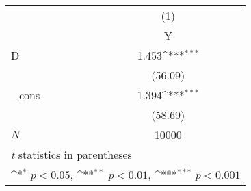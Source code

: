 {
\def\sym#1{\ifmmode^{#1}\else\(^{#1}\)\fi}
\begin{tabular}{l*{1}{c}}
\hline\hline
            &\multicolumn{1}{c}{(1)}\\
            &\multicolumn{1}{c}{Y}\\
\hline
D           &       1.453\sym{***}\\
            &     (56.09)         \\
[1em]
\_cons      &       1.394\sym{***}\\
            &     (58.69)         \\
\hline
\(N\)       &       10000         \\
\hline\hline
\multicolumn{2}{l}{\footnotesize \textit{t} statistics in parentheses}\\
\multicolumn{2}{l}{\footnotesize \sym{*} \(p<0.05\), \sym{**} \(p<0.01\), \sym{***} \(p<0.001\)}\\
\end{tabular}
}
